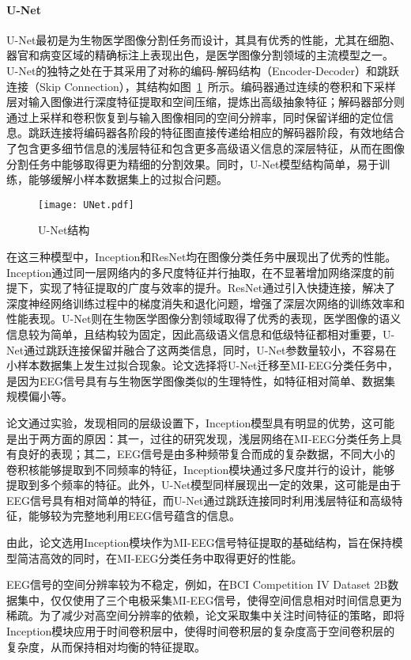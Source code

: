 \paragraph{U-Net}

U-Net\cite{ronneberger2015u}最初是为生物医学图像分割任务而设计，其具有优秀的性能，尤其在细胞、器官和病变区域的精确标注上表现出色，是医学图像分割领域的主流模型之一。U-Net的独特之处在于其采用了对称的编码-解码结构（Encoder-Decoder）和跳跃连接（Skip Connection），其结构如图~\ref{fig:UNet}~所示。编码器通过连续的卷积和下采样层对输入图像进行深度特征提取和空间压缩，提炼出高级抽象特征；解码器部分则通过上采样和卷积恢复到与输入图像相同的空间分辨率，同时保留详细的定位信息。跳跃连接将编码器各阶段的特征图直接传递给相应的解码器阶段，有效地结合了包含更多细节信息的浅层特征和包含更多高级语义信息的深层特征，从而在图像分割任务中能够取得更为精细的分割效果。同时，U-Net模型结构简单，易于训练，能够缓解小样本数据集上的过拟合问题。
\begin{figure}[ht]
  \centering
  \texttt{[image: UNet.pdf]}
  \caption{U-Net结构\cite{ronneberger2015u}}
  \label{fig:UNet}
\end{figure}

在这三种模型中，Inception和ResNet均在图像分类任务中展现出了优秀的性能。Inception通过同一层网络内的多尺度特征并行抽取，在不显著增加网络深度的前提下，实现了特征提取的广度与效率的提升。ResNet通过引入快捷连接，解决了深度神经网络训练过程中的梯度消失和退化问题，增强了深层次网络的训练效率和性能表现。U-Net则在生物医学图像分割领域取得了优秀的表现，医学图像的语义信息较为简单，且结构较为固定，因此高级语义信息和低级特征都相对重要，U-Net通过跳跃连接保留并融合了这两类信息，同时，U-Net参数量较小，不容易在小样本数据集上发生过拟合现象。论文选择将U-Net迁移至MI-EEG分类任务中，是因为EEG信号具有与生物医学图像类似的生理特性，如特征相对简单、数据集规模偏小等。

论文通过实验，发现相同的层级设置下，Inception模型具有明显的优势，这可能是出于两方面的原因：其一，过往的研究发现，浅层网络在MI-EEG分类任务上具有良好的表现；其二，EEG信号是由多种频带复合而成的复杂数据，不同大小的卷积核能够提取到不同频率的特征，Inception模块通过多尺度并行的设计，能够提取到多个频率的特征。此外，U-Net模型同样展现出一定的效果，这可能是由于EEG信号具有相对简单的特征，而U-Net通过跳跃连接同时利用浅层特征和高级特征，能够较为完整地利用EEG信号蕴含的信息。

由此，论文选用Inception模块作为MI-EEG信号特征提取的基础结构，旨在保持模型简洁高效的同时，在MI-EEG分类任务中取得更好的性能。

EEG信号的空间分辨率较为不稳定，例如，在BCI Competition IV Dataset 2B数据集\cite{tangermann2012review}中，仅仅使用了三个电极采集MI-EEG信号，使得空间信息相对时间信息更为稀疏。为了减少对高空间分辨率的依赖，论文采取集中关注时间特征的策略，即将Inception模块应用于时间卷积层中，使得时间卷积层的复杂度高于空间卷积层的复杂度，从而保持相对均衡的特征提取。

